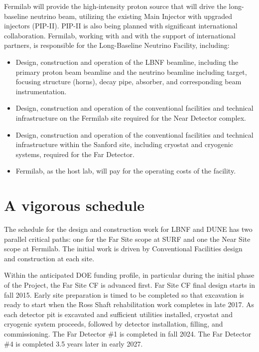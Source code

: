 Fermilab will provide the high-intensity proton source that will drive the long-baseline neutrino beam, utilizing the existing Main Injector with upgraded injectors (PIP-II).  PIP-II is also being planned with significant international collaboration.  Fermilab, working with and with the support of international partners, is responsible for the Long-Baseline Neutrino Facility, including:
\begin{itemize}
\item Design, construction and operation of the LBNF beamline, including the primary proton beam beamline and the neutrino beamline including target, focusing structure (horns), decay pipe, absorber, and corresponding beam instrumentation. 
\item Design, construction and operation of the conventional facilities and technical infrastructure on the Fermilab site required for the Near Detector complex.
\item Design, construction and operation of the conventional facilities and technical infrastructure within the Sanford site, including cryostat and cryogenic systems, required for the Far Detector.
\item Fermilab, as the host lab, will pay for the operating costs of the facility.
\end{itemize}


\section{A vigorous schedule}

The schedule for the design and construction work for LBNF and DUNE has two parallel critical paths: one for the Far Site scope at SURF and one the Near Site scope at Fermilab. The initial work is driven by Conventional Facilities design and construction at each site. 

Within the anticipated DOE funding profile, in particular during the initial phase of the Project, the Far Site CF is advanced first. Far Site CF final design starts in fall 2015. Early site preparation is timed to be completed so that excavation is ready to start when the Ross Shaft rehabilitation work completes in late 2017. As each detector pit is excavated and sufficient utilities installed, cryostat and cryogenic system proceeds, followed by detector installation, filling, and commissioning. The Far Detector \#1 is completed in fall 2024. The Far Detector \#4 is completed 3.5 years later in early 2027. 

